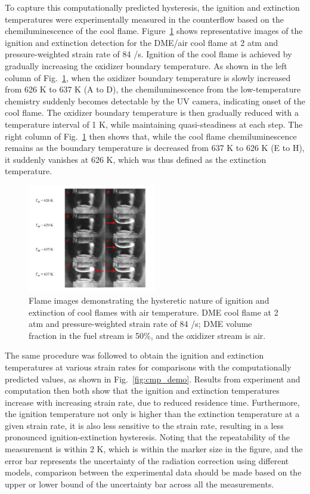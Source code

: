 \documentclass[review,3p,times]{elsarticle}
\begin{document}
To capture this computationally predicted hysteresis, the ignition and extinction temperatures were experimentally measured in the counterflow based on the chemiluminescence of the cool flame.  Figure~\ref{fig:UV} shows representative images of the ignition and extinction detection for the DME/air cool flame at 2 atm and pressure-weighted strain rate of 84 /s.  Ignition of the cool flame is achieved by gradually increasing the oxidizer boundary temperature.  As shown in the left column of Fig.~\ref{fig:UV}, when the oxidizer boundary temperature is slowly increased from 626 K to 637 K (A to D), the chemiluminescence from the low-temperature chemistry suddenly becomes detectable by the UV camera, indicating onset of the cool flame.  The oxidizer boundary temperature is then gradually reduced with a temperature interval of 1 K, while maintaining quasi-steadiness at each step.  The right column of Fig.~\ref{fig:UV} then shows that, while the cool flame chemiluminescence remains as the boundary temperature is decreased from 637 K to 626 K (E to H), it suddenly vanishes at 626 K, which was thus defined as the extinction temperature.

\begin{figure}[t]
  \centering
  \scriptsize
  \includegraphics[trim=6.5mm 7.5mm 7mm 1mm, clip=true, width=0.5\textwidth]{UV.png}
  \normalsize
  \caption{Flame images demonstrating the hysteretic nature of ignition and extinction of cool flames with air temperature. DME cool flame at 2 atm and pressure-weighted strain rate of 84 /s; DME volume fraction in the fuel stream is 50\%, and the oxidizer stream is air.}
  \label{fig:UV}
\end{figure}

The same procedure was followed to obtain the ignition and extinction temperatures at various strain rates for comparisons with the computationally predicted values, as shown in Fig.~\ref{fig:cmp_demo}.  Results from experiment and computation then both show that the ignition and extinction temperatures increase with increasing strain rate, due to reduced residence time.  Furthermore, the ignition temperature not only is higher than the extinction temperature at a given strain rate, it is also less sensitive to the strain rate, resulting in a less pronounced ignition-extinction hysteresis. Noting that the repeatability of the measurement is within 2 K, which is within the marker size in the figure, and the error bar represents the uncertainty of the radiation correction using different models, comparison between the experimental data should be made based on the upper or lower bound of the uncertainty bar across all the measurements.
\end{document}
